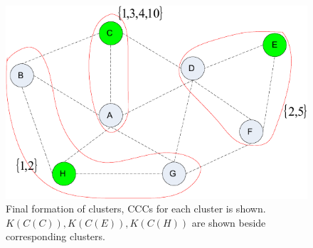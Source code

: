 \documentclass[10pt,journal,compsoc]{IEEEtran}
\theoremstyle{mytheoremstyle}
\theoremstyle{mytheoremstyle}
\theoremstyle{mytheoremstyle}
\begin{document}

\begin{figure}[h]
  \centering
  \includegraphics[width=0.5\linewidth]{final_clustering_ross.pdf}
  \caption{Final formation of clusters, CCCs for each cluster is shown. $K(C(C)),K(C(E)),K(C(H))$ are shown beside corresponding clusters.}
  \label{fig4}
\end{figure}
\end{document}
